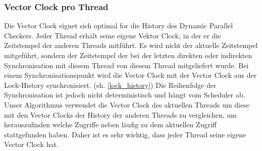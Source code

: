 \documentclass[10pt,a4paper]{article}
\begin{document}
\subsubsection{Vector Clock pro Thread}
\begin{flushleft}
Die Vector Clock eignet sich optimal for die History des Dynamic Parallel Checkers. Jeder Thread erhält seine eigene Vektor Clock, in der er die Zeitstempel der anderen Threads mitführt. Es wird nicht der aktuelle Zeitstempel mitgeführt, sondern der Zeitstempel der bei der letzten direkten oder indirekten Synchronisation mit diesem Thread von diesem Thread mitgeliefert wurde. Bei einem Synchronisationspunkt wird die Vector Clock mit der Vector Clock aus der Lock-History synchronisiert. (sh. \ref{lock_history}) Die Reihenfolge der Synchronisation ist jedoch nicht deterministisch und hängt vom Scheduler ab.\\
Unser Algorithmus verwendet die Vector Clock des aktuellen Threads um diese mit den Vector Clocks der History der anderen Threads zu vergleichen, um herauszufinden welche Zugriffe neben läufig zu dem aktuellen Zugriff stattgefunden haben. Daher ist es sehr wichtig, dass jeder Thread seine eigene Vector Clock hat.
\end{flushleft}
\end{document}
